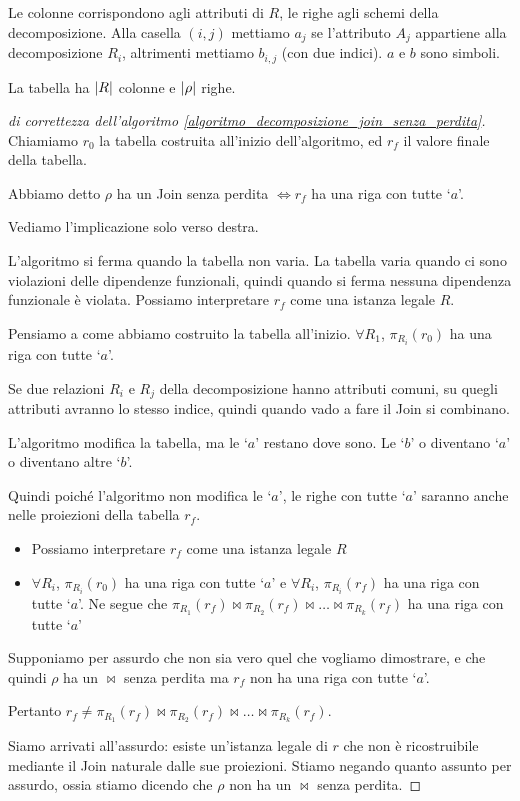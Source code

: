Le colonne corrispondono agli attributi di $R$, le righe agli schemi della decomposizione. Alla casella $(i, j)$ mettiamo $a_j$ se l'attributo $A_j$ appartiene alla decomposizione $R_i$, altrimenti mettiamo $b_{i,j}$ (con due indici). $a$ e $b$ sono simboli.

La tabella ha $\left\lvert{R}\right\rvert$ colonne e $\left\lvert{\rho}\right\rvert$ righe.

\begin{proof}[di correttezza dell'algoritmo \ref{algoritmo_decomposizione_join_senza_perdita}]
Chiamiamo $r_0$ la tabella costruita all'inizio dell'algoritmo, ed $r_f$ il valore finale della tabella.

Abbiamo detto $\rho$ ha un Join senza perdita $\iff r_f$ ha una riga con tutte `$a$'.

Vediamo l'implicazione solo verso destra.

L'algoritmo si ferma quando la tabella non varia. La tabella varia quando ci sono violazioni delle dipendenze funzionali, quindi quando si ferma nessuna dipendenza funzionale \`e violata. Possiamo interpretare $r_f$ come una istanza legale $R$.

Pensiamo a come abbiamo costruito la tabella all'inizio. $\forall R_1$, $\pi_{R_i} (r_0)$ ha una riga con tutte `$a$'.

Se due relazioni $R_i$ e $R_j$ della decomposizione hanno attributi comuni, su quegli attributi avranno lo stesso indice, quindi quando vado a fare il Join si combinano.

L'algoritmo modifica la tabella, ma le `$a$' restano dove sono. Le `$b$' o diventano `$a$' o diventano altre `$b$'.

Quindi poich\'e l'algoritmo non modifica le `$a$', le righe con tutte `$a$' saranno anche nelle proiezioni della tabella $r_f$.

\begin{itemize}
    \item Possiamo interpretare $r_f$ come una istanza legale $R$
    \item $\forall R_i$, $\pi_{R_i} (r_0)$ ha una riga con tutte `$a$' e $\forall R_i$, $\pi_{R_i} (r_f)$ ha una riga con tutte `$a$'. Ne segue che $\pi_{R_1} (r_f) \Join \pi_{R_2} (r_f) \Join \ldots \Join \pi_{R_k} (r_f)$ ha una riga con tutte `$a$'
\end{itemize}

Supponiamo per assurdo che non sia vero quel che vogliamo dimostrare, e che quindi $\rho$ ha un $\Join$ senza perdita ma $r_f$ non ha una riga con tutte `$a$'.

Pertanto $r_f \neq \pi_{R_1} (r_f) \Join \pi_{R_2} (r_f) \Join \ldots \Join \pi_{R_k} (r_f)$.

Siamo arrivati all'assurdo: esiste un'istanza legale di $r$ che non \`e ricostruibile mediante il Join naturale dalle sue proiezioni. Stiamo negando quanto assunto per assurdo, ossia stiamo dicendo che $\rho$ non ha un $\Join$ senza perdita.
\end{proof}

